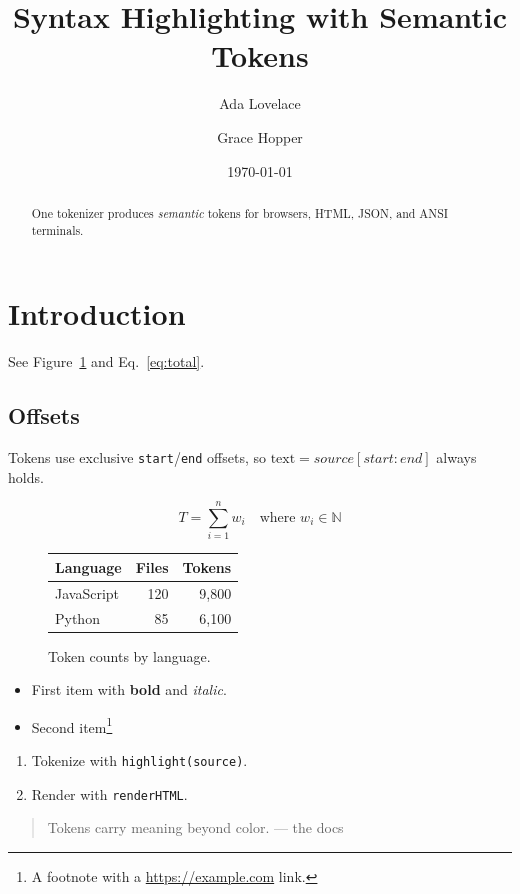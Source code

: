 \documentclass[11pt]{article}
\title{Syntax Highlighting with Semantic Tokens}
\author{Ada Lovelace \and Grace Hopper}
\date{\today}
\begin{document}
\maketitle

\begin{abstract}
One tokenizer produces \emph{semantic} tokens for browsers,
HTML, JSON, and ANSI terminals.
\end{abstract}

\section{Introduction}
\label{sec:intro}
See Figure~\ref{fig:tokens} and Eq.~\eqref{eq:total}.

\subsection{Offsets}
Tokens use exclusive \texttt{start}/\texttt{end} offsets, so
$\text{text} = source[start:end]$ always holds.

\begin{equation}
  \label{eq:total}
  T = \sum_{i=1}^{n} w_i \quad \text{where } w_i \in \mathbb{N}
\end{equation}

\begin{figure}[h]
  \centering
  \begin{tabular}{lrr}
    \hline
    Language & Files & Tokens \\
    \hline
    JavaScript & 120 & 9,800 \\
    Python & 85 & 6,100 \\
    \hline
  \end{tabular}
  \caption{Token counts by language.}
  \label{fig:tokens}
\end{figure}

\begin{itemize}
  \item First item with \textbf{bold} and \textit{italic}.
  \item Second item\footnote{A footnote with a \url{https://example.com} link.}
\end{itemize}

\begin{enumerate}
  \item Tokenize with \verb|highlight(source)|.
  \item Render with \verb|renderHTML|.
\end{enumerate}

\begin{quote}
  Tokens carry meaning beyond color. --- the docs
\end{quote}



\end{document}
